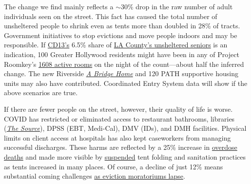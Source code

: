 \documentclass[11pt]{article}
\begin{document}
 The change we find mainly reflects a $\sim$30\% drop in the raw number
of adult individuals seen on the street. This fact has caused the total number of unsheltered people to shrink 
even as tents more than doubled in 28\% of tracts. Government initiatives to stop evictions and move 
people indoors and may be responsible. If \href{https://www.lahsa.org/documents?id=4672-2020-homeless-count-council-district-13}{CD13's} 6.5\% share of \href{https://www.lahsa.org/documents?id=4585-2020-greater-los-angeles-homeless-count-los-angeles-continuum-of-care-coc-}{LA County's unsheltered seniors} 
is an indication, 100 Greater Hollywood residents might have been in any of Project Roomkey's 
\href{https://projectroomkeytracker.com/}{1608 active rooms} on the night of the count---about half the 
inferred change. The new Riverside \href{https://www.lamayor.org/ABridgeHome}
{\it A Bridge Home} and 120 PATH supportive housing units may also have contributed.
Coordinated Entry System data will show if the above scenarios are true.

If there are fewer people on the street, however, their quality of life is worse. 
COVID has restricted or eliminated access to restaurant bathrooms, libraries 
(\href{https://www.lapl.org/homeless-resources/the-source}{\it The Source}), DPSS 
(EBT, Medi-Cal), DMV (IDs), and DMH facilities. Physical limits on client access at 
hospitals has also kept caseworkers from managing successful discharges. These harms 
are reflected by a 25\% increase in 
\href{https://www.latimes.com/california/story/2021-01-07/the-powerful-synthetic-opioid-fentanyl-is-behind-rising-deaths-in-the-homeless-population}{overdose deaths} and made more visible by \href{https://clkrep.lacity.org/onlinedocs/2020/20-0147_misc_3-17-20_p.pdf}{suspended}
tent folding and sanitation practices as tents increased in many places. 
Of course, a decline of just 12\% means substantial coming challenges
 \href{https://www.latimes.com/california/story/2021-01-12/new-report-foresees-tens-of-thousands-losing-homes-by-2023}
{as eviction moratoriums lapse}.
\end{document}
